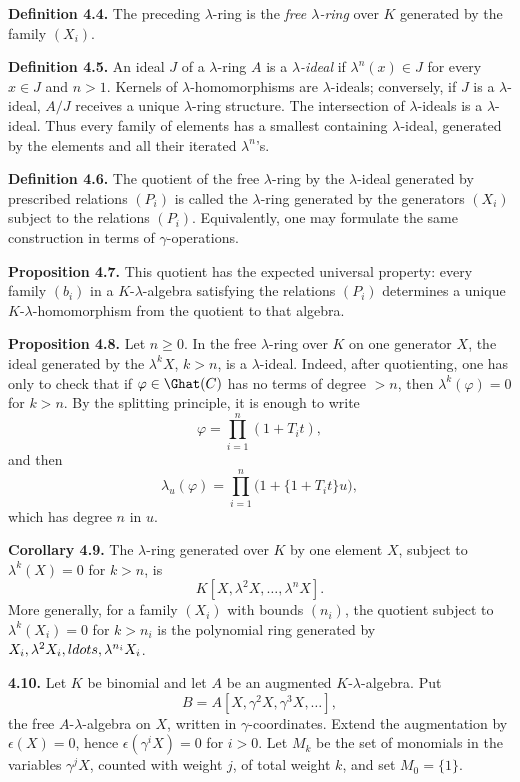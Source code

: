 \documentclass[11pt]{article}
\begin{document}
\textbf{Definition 4.4.} The preceding \(\lambda\)-ring is the \emph{free \(\lambda\)-ring} over \(K\) generated by the family \((X_i)\).

\textbf{Definition 4.5.} An ideal \(J\) of a \(\lambda\)-ring \(A\) is a \emph{\(\lambda\)-ideal} if \(\lambda^n(x)\in J\) for every \(x\in J\) and \(n>1\). Kernels of \(\lambda\)-homomorphisms are \(\lambda\)-ideals; conversely, if \(J\) is a \(\lambda\)-ideal, \(A/J\) receives a unique \(\lambda\)-ring structure. The intersection of \(\lambda\)-ideals is a \(\lambda\)-ideal. Thus every family of elements has a smallest containing \(\lambda\)-ideal, generated by the elements and all their iterated \(\lambda^n\)'s.

\textbf{Definition 4.6.} The quotient of the free \(\lambda\)-ring by the \(\lambda\)-ideal generated by prescribed relations \((P_i)\) is called the \(\lambda\)-ring generated by the generators \((X_i)\) subject to the relations \((P_i)\). Equivalently, one may formulate the same construction in terms of \(\gamma\)-operations.

\textbf{Proposition 4.7.} This quotient has the expected universal property: every family \((b_i)\) in a \(K\)-\(\lambda\)-algebra satisfying the relations \((P_i)\) determines a unique \(K\)-\(\lambda\)-homomorphism from the quotient to that algebra.

\textbf{Proposition 4.8.} Let \(n\ge0\). In the free \(\lambda\)-ring over \(K\) on one generator \(X\), the ideal generated by the \(\lambda^kX\), \(k>n\), is a \(\lambda\)-ideal. Indeed, after quotienting, one has only to check that if \(\varphi\in\Ghat(C)\) has no terms of degree \(>n\), then \(\lambda^k(\varphi)=0\) for \(k>n\). By the splitting principle, it is enough to write
\[
  \varphi=\prod_{i=1}^{n}(1+T_it),
\]
and then
\[
  \lambda_u(\varphi)=\prod_{i=1}^{n}\bigl(1+\{1+T_it\}u\bigr),
\]
which has degree \(n\) in \(u\).

\textbf{Corollary 4.9.} The \(\lambda\)-ring generated over \(K\) by one element \(X\), subject to \(\lambda^k(X)=0\) for \(k>n\), is
\[
  K[X,\lambda^2X,\ldots,\lambda^nX].
\]
More generally, for a family \((X_i)\) with bounds \((n_i)\), the quotient subject to \(\lambda^k(X_i)=0\) for \(k>n_i\) is the polynomial ring generated by \(X_i,\lambda^2X_i,\\ldots,\lambda^{n_i}X_i\).

\textbf{4.10.} Let \(K\) be binomial and let \(A\) be an augmented \(K\)-\(\lambda\)-algebra. Put
\[
  B=A[X,\gamma^2X,\gamma^3X,\ldots],
\]
the free \(A\)-\(\lambda\)-algebra on \(X\), written in \(\gamma\)-coordinates. Extend the augmentation by \(\epsilon(X)=0\), hence \(\epsilon(\gamma^iX)=0\) for \(i>0\). Let \(M_k\) be the set of monomials in the variables \(\gamma^jX\), counted with weight \(j\), of total weight \(k\), and set \(M_0=\{1\}\).
\end{document}
